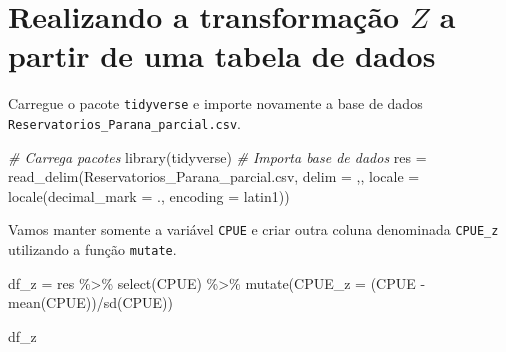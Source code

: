 \documentclass[
]{book}
\newenvironment{Shaded}{\begin{snugshade}}{\end{snugshade}}
\newcommand{\AttributeTok}[1]{\textcolor[rgb]{0.77,0.63,0.00}{#1}}
\newcommand{\CommentTok}[1]{\textcolor[rgb]{0.56,0.35,0.01}{\textit{#1}}}
\newcommand{\FunctionTok}[1]{\textcolor[rgb]{0.00,0.00,0.00}{#1}}
\newcommand{\NormalTok}[1]{#1}
\newcommand{\OtherTok}[1]{\textcolor[rgb]{0.56,0.35,0.01}{#1}}
\newcommand{\SpecialCharTok}[1]{\textcolor[rgb]{0.00,0.00,0.00}{#1}}
\newcommand{\StringTok}[1]{\textcolor[rgb]{0.31,0.60,0.02}{#1}}
\begin{document}
\hypertarget{realizando-a-transformauxe7uxe3o-z-a-partir-de-uma-tabela-de-dados}{%
\section{\texorpdfstring{Realizando a transformação \(Z\) a partir de uma tabela de dados}{Realizando a transformação Z a partir de uma tabela de dados}}\label{realizando-a-transformauxe7uxe3o-z-a-partir-de-uma-tabela-de-dados}}

Carregue o pacote \texttt{tidyverse} e importe novamente a base de dados \texttt{Reservatorios\_Parana\_parcial.csv}.

\begin{Shaded}
\begin{Highlighting}[]
\CommentTok{\# Carrega pacotes}
\FunctionTok{library}\NormalTok{(tidyverse)}
\CommentTok{\# Importa base de dados }
\NormalTok{res }\OtherTok{=} \FunctionTok{read\_delim}\NormalTok{(}\StringTok{\textquotesingle{}Reservatorios\_Parana\_parcial.csv\textquotesingle{}}\NormalTok{,}
                  \AttributeTok{delim =} \StringTok{\textquotesingle{},\textquotesingle{}}\NormalTok{,}
                  \AttributeTok{locale =} \FunctionTok{locale}\NormalTok{(}\AttributeTok{decimal\_mark =} \StringTok{\textquotesingle{}.\textquotesingle{}}\NormalTok{,}
                                  \AttributeTok{encoding =} \StringTok{\textquotesingle{}latin1\textquotesingle{}}\NormalTok{))}
\end{Highlighting}
\end{Shaded}

Vamos manter somente a variável \texttt{CPUE} e criar outra coluna denominada \texttt{CPUE\_z} utilizando a função \texttt{mutate}.

\begin{Shaded}
\begin{Highlighting}[]
\NormalTok{df\_z }\OtherTok{=}\NormalTok{ res }\SpecialCharTok{\%\textgreater{}\%} 
  \FunctionTok{select}\NormalTok{(CPUE) }\SpecialCharTok{\%\textgreater{}\%} 
  \FunctionTok{mutate}\NormalTok{(}\AttributeTok{CPUE\_z =}\NormalTok{ (CPUE }\SpecialCharTok{{-}} \FunctionTok{mean}\NormalTok{(CPUE))}\SpecialCharTok{/}\FunctionTok{sd}\NormalTok{(CPUE))}

\NormalTok{df\_z}
\end{Highlighting}
\end{Shaded}
\end{document}
